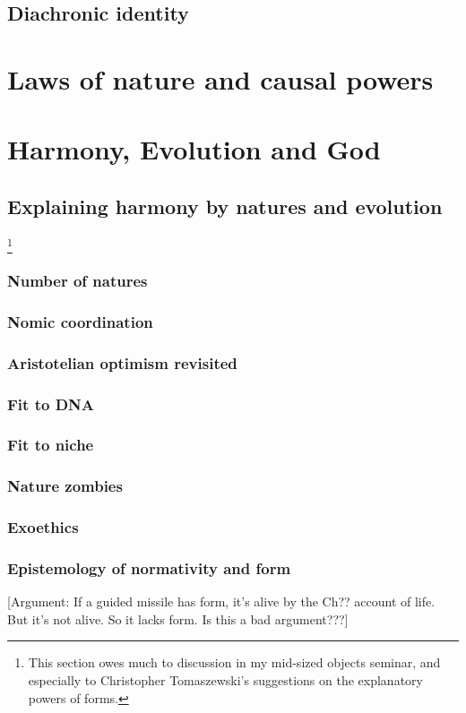 \section{Diachronic identity}
\chaptertail 

\def\mychapter{IX}

\chapter{Laws of nature and causal powers}\label{ch:laws}
\chaptertail

\def\mychapter{X}

\chapter{Harmony, Evolution and God}\label{ch:God}
\section{Explaining harmony by natures and evolution}
\footnote{This section owes much to discussion in my mid-sized objects seminar, and especially to Christopher Tomaszewski's suggestions on the explanatory powers of forms.}
\subsection{Number of natures}
\subsection{Nomic coordination}
\subsection{Aristotelian optimism revisited}
\subsection{Fit to DNA}
\subsection{Fit to niche}
\subsection{Nature zombies}
\subsection{Exoethics}
\subsection{Epistemology of normativity and form}\label{ch:epist-of-form}
[Argument: If a guided missile has form, it's alive by the Ch?? account of life. But it's not alive. So it lacks form. Is this a bad argument???]
